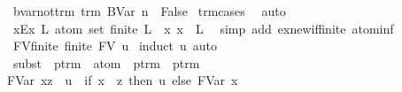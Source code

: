\begin{isabellebody}
\isamarkupfalse%
\ bvar{\isacharunderscore}not{\isacharunderscore}trm{\isacharcolon}\ {\isachardoublequoteopen}trm\ {\isacharparenleft}BVar\ n{\isacharparenright}\ {\isasymLongrightarrow}\ False{\isachardoublequoteclose}\isanewline
%
\isadelimproof
%
\endisadelimproof
%
\isatagproof
{}\isamarkupfalse%
\ trm{\isachardot}cases\ \isamarkupfalse%
\ auto%
\endisatagproof
{\isafoldproof}%
%
\isadelimproof
\isanewline
%
\endisadelimproof
\isanewline
{}\isamarkupfalse%
\ x{\isacharunderscore}Ex{\isacharcolon}\ {\isachardoublequoteopen}{\isasymAnd}L{\isacharcolon}{\isacharcolon}\ atom\ set{\isachardot}\ finite\ L\ {\isasymLongrightarrow}\ {\isasymexists}x{\isachardot}\ x\ {\isasymnotin}\ L{\isachardoublequoteclose}\ \isanewline
%
\isadelimproof
%
\endisadelimproof
%
\isatagproof
{}\isamarkupfalse%
\ {\isacharparenleft}simp\ add{\isacharcolon}\ ex{\isacharunderscore}new{\isacharunderscore}if{\isacharunderscore}finite\ atom{\isacharunderscore}inf{\isacharparenright}%
\endisatagproof
{\isafoldproof}%
%
\isadelimproof
\isanewline
%
\endisadelimproof
\isanewline
{}\isamarkupfalse%
\ FV{\isacharunderscore}finite{\isacharcolon}\ {\isachardoublequoteopen}finite\ {\isacharparenleft}FV\ u{\isacharparenright}{\isachardoublequoteclose}\isanewline
%
\isadelimproof
%
\endisadelimproof
%
\isatagproof
{}\isamarkupfalse%
\ {\isacharparenleft}induct\ u{\isacharcomma}\ auto{\isacharparenright}%
\endisatagproof
{\isafoldproof}%
%
\isadelimproof
%
\endisadelimproof
%
\isamarkuptrue%
\isamarkupfalse%
\ subst\ {\isacharcolon}{\isacharcolon}\ {\isachardoublequoteopen}ptrm\ {\isasymRightarrow}\ atom\ {\isasymRightarrow}\ ptrm\ {\isasymRightarrow}\ ptrm{\isachardoublequoteclose}\ {\isacharparenleft}{\isachardoublequoteopen}{\isacharunderscore}\ {\isacharbrackleft}{\isacharunderscore}\ {\isacharcolon}{\isacharcolon}{\isacharequal}\ {\isacharunderscore}{\isacharbrackright}{\isachardoublequoteclose}\ {\isacharbrackleft}{}{}{\isacharcomma}\ {}{}{\isacharcomma}\ {}{}{\isacharbrackright}\ {}{}{\isacharparenright}\ \isanewline
{\isachardoublequoteopen}{\isacharparenleft}FVar\ x{\isacharparenright}{\isacharbrackleft}z\ {\isacharcolon}{\isacharcolon}{\isacharequal}\ u{\isacharbrackright}\ {\isacharequal}\ {\isacharparenleft}if\ x\ {\isacharequal}\ z\ then\ u\ else\ FVar\ x{\isacharparenright}{\isachardoublequoteclose}\ {\isacharbar}\isanewline

\end{isabellebody}
